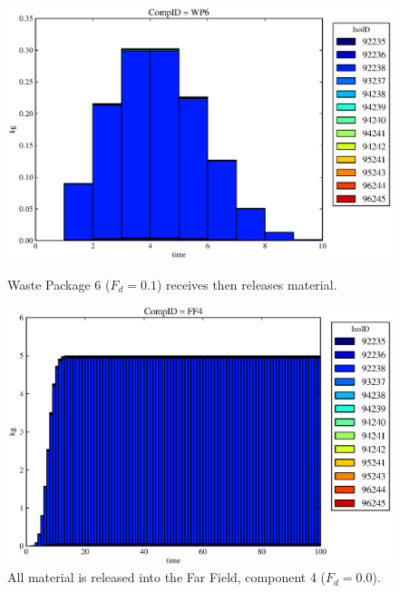 \begin{figure}[ht]
\begin{minipage}[b]{0.45\linewidth}
\end{minipage}
\hspace{0.05\linewidth}
\begin{minipage}[b]{0.45\linewidth}
  \includegraphics[width=\textwidth]{./chapters/demonstration/base/mcI2.eps}
  \caption[Case MCI Waste Package Contaminants.]{ 
    Waste Package 6 ($F_d = 0.1$) receives then releases material.
    }
  \label{fig:mcIwp6}

  \includegraphics[width=\textwidth]{./chapters/demonstration/base/mcI0.eps}
  \caption[Case MCI Waste Package Contaminants.]{All material is released into the Far Field, component 4 ($F_d=0.0$).}
  \label{fig:mcIff0}


  \end{minipage}
\end{figure}

